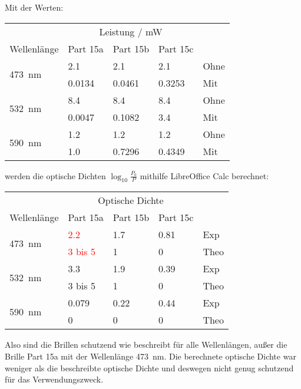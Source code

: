 		Mit der Werten:
		\begin{center}
			\begin{tabular}{lllll}
				\toprule
				& \multicolumn{3}{c}{Leistung / \si{\milli\watt}} & \\
				\cmidrule{2-4}
				Wellenlänge & Part 15a & Part 15b & Part 15c & \\
				\midrule
				\multirow{2}{*}{\SI{473}{\nano\meter}} 
					& \num{2.1}    & \num{2.1}    & \num{2.1}    & Ohne \\
					& \num{0.0134} & \num{0.0461} & \num{0.3253} & Mit \\
				\multirow{2}{*}{\SI{532}{\nano\meter}} 
					& \num{8.4}    & \num{8.4}    & \num{8.4}    & Ohne \\
					& \num{0.0047} & \num{0.1082} & \num{3.4}    & Mit \\
				\multirow{2}{*}{\SI{590}{\nano\meter}} 
					& \num{1.2}    & \num{1.2}    & \num{1.2}    & Ohne \\
					& \num{1.0}    & \num{0.7296} & \num{0.4349} & Mit \\
				\bottomrule
			\end{tabular}
		\end{center}
		\pagebreak
		werden die optische Dichten $\log_{10}{\frac{P_0}{P}}$ mithilfe LibreOffice Calc berechnet:
		\begin{center}
			\begin{tabular}{lllll}
				\toprule
				& \multicolumn{3}{c}{Optische Dichte} & \\
				\cmidrule{2-4}
				Wellenlänge & Part 15a & Part 15b & Part 15c & \\
				\midrule
				\multirow{2}{*}{\SI{473}{\nano\meter}} 
					& \textcolor{red}{\num{2.2}}   & \num{1.7}  & \num{0.81} & Exp \\
					& \textcolor{red}{3 bis 5}     & \num{1}    & \num{0}    & Theo \\
				\multirow{2}{*}{\SI{532}{\nano\meter}} 
					& \num{3.3}   & \num{1.9}  & \num{0.39} & Exp \\
					& 3 bis 5     & \num{1}    & \num{0}    & Theo \\
				\multirow{2}{*}{\SI{590}{\nano\meter}} 
					& \num{0.079} & \num{0.22} & \num{0.44} & Exp \\
					& \num{0}     & \num{0}    & \num{0}    & Theo \\
				\bottomrule
			\end{tabular}
		\end{center}
		Also sind die Brillen schutzend wie beschreibt für alle Wellenlängen, außer die Brille Part 15a mit der Wellenlänge \SI{473}{\nano\meter}. Die berechnete optische Dichte war weniger als die beschreibte optische Dichte und deswegen nicht genug schutzend für das Verwendungszweck. 

